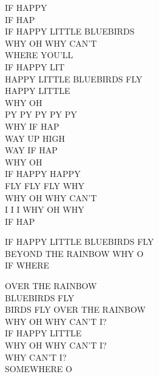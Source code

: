 IF HAPPY\\
IF HAP\\
IF HAPPY LITTLE BLUEBIRDS\\
WHY OH WHY CAN'T\\
WHERE YOU'LL\\
IF HAPPY LIT\\
HAPPY LITTLE BLUEBIRDS FLY\\
HAPPY LITTLE\\
WHY OH\\
PY PY PY PY PY\\
WHY IF HAP\\
WAY UP HIGH\\
WAY IF HAP\\
WHY OH\\
IF HAPPY HAPPY\\
FLY FLY FLY WHY\\
WHY OH WHY CAN'T\\
I I I WHY OH WHY\\
IF HAP\par

IF HAPPY LITTLE BLUEBIRDS FLY\\
BEYOND THE RAINBOW WHY O\\
IF WHERE\par

OVER THE RAINBOW\\
BLUEBIRDS FLY\\
BIRDS FLY OVER THE RAINBOW\\
WHY OH WHY CAN'T I?\\
IF HAPPY LITTLE\\
WHY OH WHY CAN'T I?\\
WHY CAN'T I?\\
SOMEWHERE O\\
